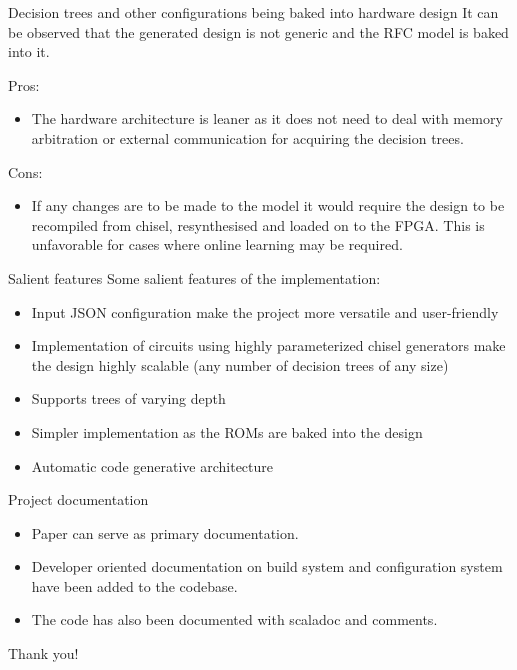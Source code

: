 \documentclass[presentation]{beamer}
\begin{document}
\begin{frame}[label={sec:orgb31b19f}]{Decision trees and other configurations being baked into hardware design}
It can be observed that the generated design is not generic and the RFC model is baked into it.

\begin{exampleblock}{Pros:}
\begin{itemize}
\item The hardware architecture is leaner as it does not need to deal with memory arbitration or external communication for acquiring the decision trees.
\end{itemize}
\end{exampleblock}

\begin{alertblock}{Cons:}
\begin{itemize}
\item If any changes are to be made to the model it would require the design to be recompiled from chisel, resynthesised and loaded on to the FPGA. This is unfavorable for cases where online learning may be required.
\end{itemize}
\end{alertblock}
\end{frame}

\begin{frame}[label={sec:org30ac9cf}]{Salient features}
Some salient features of the implementation:
\begin{itemize}
\item Input JSON configuration make the project more versatile and user-friendly
\item Implementation of circuits using highly parameterized chisel generators make the design highly scalable (any number of decision trees of any size)
\item Supports trees of varying depth
\item Simpler implementation as the ROMs are baked into the design
\item Automatic code generative architecture
\end{itemize}
\end{frame}

\begin{frame}[label={sec:org90f65fa}]{Project documentation}
\begin{itemize}
\item Paper can serve as primary documentation.
\item Developer oriented documentation on build system and configuration system have been added to the codebase.
\item The code has also been documented with scaladoc and comments.
\end{itemize}
\end{frame}

\begin{frame}[label={sec:orgde48054}]{}
\centering
{}
Thank you!
\end{frame}
\end{document}
